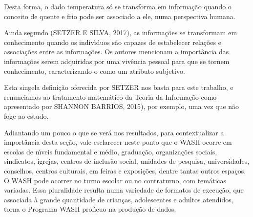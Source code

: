 \documentclass[
12pt,		%
openright,	%
twoside,  %
a4paper,			%
chapter=TITLE,		%
english,			%
french,				%
spanish,			%
brazil				%
]{USPSC-classe/USPSC}
\begin{document}
Desta forma, o dado \textquotedbl  temperatura \textquotedbl  s\'o se transforma em informa\c{c}\~ao quando o conceito de \textquotedbl  quente \textquotedbl  e \textquotedbl  frio \textquotedbl  pode ser associado a ele, numa perspectiva humana.

















Ainda segundo (SETZER E SILVA, 2017), as informa\c{c}\~oes se transformam em conhecimento quando os indiv\'{\i}duos s\~ao capazes de estabelecer rela\c{c}\~oes e associa\c{c}\~oes entre as informa\c{c}\~oes. Os autores mencionam a import\^ancia das informa\c{c}\~oes serem adquiridas por uma viv\^encia pessoal para que se tornem conhecimento, caracterizando-o como um atributo subjetivo.

















Esta singela defini\c{c}\~ao oferecida por SETZER nos basta para este trabalho, e renunciamos ao tratamento matem\'atico da Teoria da Informa\c{c}\~ao como apresentado por SHANNON BARRIOS, 2015), por exemplo, uma vez que n\~ao foge ao estudo.

















Adiantando um pouco o que se ver\'a nos resultados, para contextualizar a import\^ancia desta se\c{c}\~ao, vale esclarecer neste ponto que o WASH ocorre  em escolas de n\'{\i}veis fundamental e m\'edio, gradua\c{c}\~ao, organiza\c{c}\~oes sociais, sindicatos, igrejas, centros de inclus\~ao social, unidades de pesquisa, universidades,  conselhos, centros culturais, em feiras e exposi\c{c}\~oes, dentre tantas outros espa\c{c}os. O WASH pode ocorrer no turno escolar ou no contraturno, com tem\'aticas variadas.  Essa pluralidade resulta numa variedade de formatos de execu\c{c}\~ao, que associada \`a grande quantidade de crian\c{c}as, adolescentes e adultos atendidos, torna o Programa WASH prof\'{\i}cuo na produ\c{c}\~ao de dados.
\end{document}
